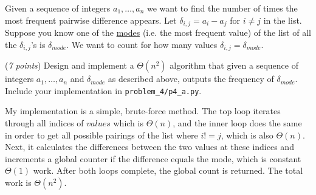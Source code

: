 \documentclass{hw_template}
\begin{document}
\begin{problem}
  Given a sequence of integers $a_1,\ldots,a_n$ we want to find the
  number of times the most frequent pairwise difference appears.
  Let $\delta_{i, j} = a_i - a_j$ for $i \ne j$ in the list. Suppose you know one of the \href{https://en.wikipedia.org/wiki/Mode_(statistics)}{modes} (i.e. the most frequent value) of the list of all the $\delta_{i, j}$'s is $\delta_{mode}$. We want to count for how many values $\delta_{i, j} = \delta_{mode}$. 
\begin{subproblem}
    (\textit{7 points})
    Design and implement a $\Theta(n ^ 2)$ algorithm that given a sequence of integers $a_1,\ldots,a_n$ and $\delta_{mode}$ as described above, outputs the frequency of $\delta_{mode}$. Include your implementation in \texttt{problem\_4/p4\_a.py}.
  \end{subproblem}
    \begin{solution}
        My implementation is a simple, brute-force method. The top loop iterates through all indices of $values$ which is $\Theta(n)$, and the inner loop does the same in order to 
        get all possible pairings of the list where $i != j$, which is also $\Theta(n)$. Next, it calculates the differences between the two values at these indices and increments a 
        global counter if the difference equals the mode, which is constant $\Theta(1)$ work. After both loops complete, the global count is returned. The total work is $\Theta(n ^ 2)$.
    \end{solution}


\end{problem}
\end{document}
